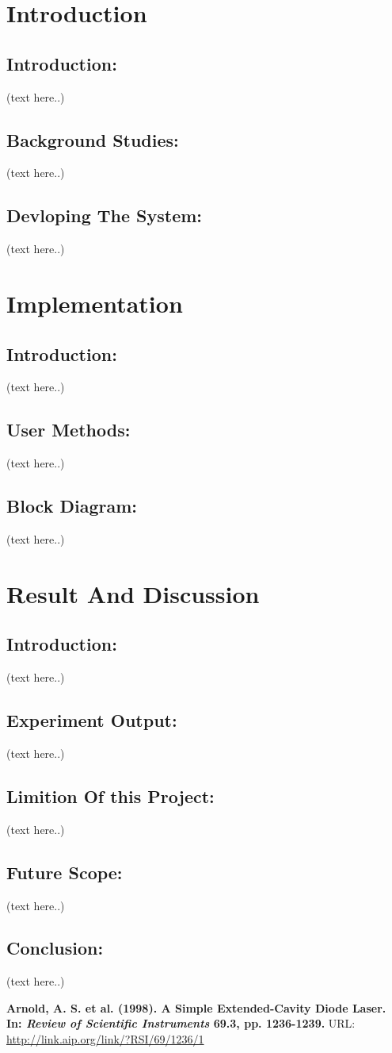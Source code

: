 \documentclass[12pt,a4paper]{report}
\begin{document}
	\tableofcontents{}
	\chapter{Introduction}
	\section{Introduction: }
	(text here..)
	\section{Background Studies: }
	(text here..)
	\section{Devloping The System: }
	(text here..)
	
	\chapter{Implementation}
	\section{Introduction: }
	(text here..)
	\section{User Methods: }
	(text here..)
	\section{Block Diagram: }
	(text here..)
	
	\chapter{Result And Discussion}
	\section{Introduction: }
	(text here..)
	\section{Experiment Output: }
	(text here..)
	\section{Limition Of this Project: }
	(text here..)
	\section{Future Scope: }
	(text here..)
	\section{Conclusion: }
	(text here..)
	\begin{thebibliography}{9}
		 \textbf{Arnold, A. S. et al. (1998). A Simple Extended-Cavity Diode Laser. In: \textit{Review of Scientific Instruments} 69.3, pp. 1236-1239.} URL: \url{http://link.aip.org/link/?RSI/69/1236/1}
	\end{thebibliography}
	
\end{document}
